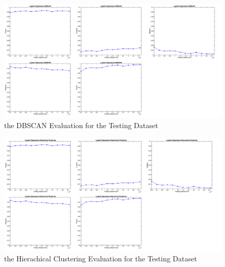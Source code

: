 \begin{figure}
\centering
\includegraphics[scale=0.23]{DBTest.pdf}
\caption{the DBSCAN Evaluation for the Testing Dataset}
\end{figure}
\begin{figure}
\centering
\includegraphics[scale=0.23]{HITest.pdf}
\caption{the Hierachical Clustering Evaluation for the Testing Dataset}
\end{figure}
   

